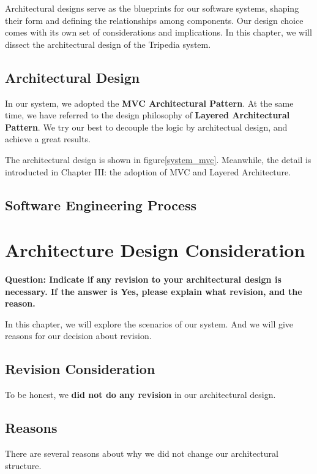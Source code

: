\documentclass[conference]{IEEEtran}
\begin{document}
Architectural designs serve as the blueprints for our software systems, shaping their form and defining the relationships among components. Our design choice comes with its own set of considerations and implications. In this chapter, we will dissect the architectural design of the Tripedia system. 


\subsection{\textbf{Architectural Design}}

In our system, we adopted the \textbf{MVC Architectural Pattern}. At the same time, we have referred to the design philosophy of \textbf{Layered Architectural Pattern}. We try our best to decouple the logic by architectual design, and achieve a great results.

The architectural design is shown in figure\ref{system_mvc}. Meanwhile, the detail is introducted in Chapter III: the adoption of MVC and Layered Architecture.


\subsection{\textbf{Software Engineering Process}}



\section{\textbf{Architecture Design Consideration}}

\textbf{Question: Indicate if any revision to your architectural design is necessary. If the answer is Yes, please explain what revision, and the reason.}

In this chapter, we will explore the scenarios of our system. And we will give reasons for our decision about revision.

\subsection{\textbf{Revision Consideration}}

To be honest, we \textbf{did not do any revision} in our architectural design. 

\subsection{\textbf{Reasons}}

There are several reasons about why we did not change our architectural structure. 
\end{document}
